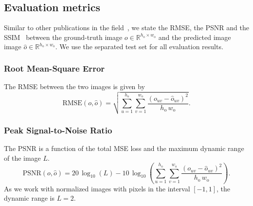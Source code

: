 \subsection{Evaluation metrics}
Similar to other publications in the field~\cite{liu2018image, yu2018generative, stolzle2022reconstructing}, %
we state the \gls{RMSE}, the \gls{PSNR} and the \gls{SSIM}~\cite{wang2004image} between the ground-truth image $o \in \mathbb{R}^{h_\mathrm{o} \times w_\mathrm{o}}$ and the predicted image image $\hat{o} \in \mathbb{R}^{h_\mathrm{o} \times w_\mathrm{o}}$.
We use the separated test set for all evaluation results.

\subsubsection{Root Mean-Square Error}
The \gls{RMSE} between the two images is given by
\begin{equation}
    \text{RMSE}(o, \hat{o}) = \sqrt{\sum_{u = 1}^{h_\mathrm{o}} \sum_{v = 1}^{w_\mathrm{o}} \frac{(o_{uv} - \hat{o}_{uv})^2}{h_\mathrm{o} \, w_\mathrm{o}}}.
\end{equation}

\subsubsection{Peak Signal-to-Noise Ratio}
The \gls{PSNR} is a function of the total \gls{MSE} loss and the maximum dynamic range of the image $L$. 
\begin{equation}
    \mathrm{PSNR}(o, \hat{o}) = 20 \, \log_{10} (L) - 10 \, \log_{10} \left (\sum_{u = 1}^{h_\mathrm{o}} \sum_{v = 1}^{w_\mathrm{o}} \frac{(o_{uv} - \hat{o}_{uv})^2}{h_\mathrm{o} \, w_\mathrm{o}} \right ).
\end{equation}
As we work with normalized images with pixels in the interval $[-1, 1]$, the dynamic range is $L = 2$.

